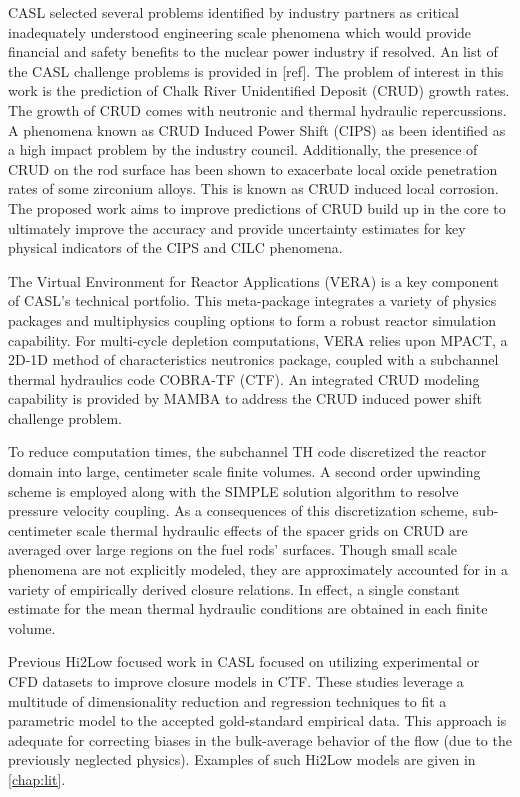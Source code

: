 CASL selected several problems identified by industry partners as critical
inadequately understood engineering scale phenomena which would provide financial and
safety benefits to the nuclear power industry if resolved.  An list of the CASL
challenge problems is provided in [ref].  The problem of interest in this
work is the prediction of Chalk River Unidentified Deposit (CRUD) growth rates.
The growth of CRUD comes with neutronic and thermal hydraulic repercussions.  A
phenomena known as CRUD Induced Power Shift (CIPS) as been identified as a high
impact problem by the industry council.  Additionally, the presence of CRUD on the rod
surface has been shown to exacerbate local oxide penetration rates of some zirconium alloys.
This is known as CRUD induced local corrosion.
The proposed work aims to improve predictions of CRUD build up in the core to ultimately improve the
accuracy and provide uncertainty estimates for key physical indicators of the CIPS and CILC phenomena.

The Virtual Environment for Reactor Applications (VERA) is a key component of
CASL's technical portfolio.  This meta-package integrates a variety of physics
packages and multiphysics coupling options to form a robust reactor simulation
capability.  For multi-cycle depletion computations, VERA relies upon MPACT, a
2D-1D method of characteristics neutronics package, coupled with a subchannel
thermal hydraulics code COBRA-TF (CTF).  An integrated CRUD modeling capability
is provided by MAMBA to address the CRUD induced power shift challenge problem.

To reduce computation times, the subchannel TH code discretized the reactor
domain into large, centimeter scale finite volumes.  A second order upwinding
scheme is employed along with the SIMPLE solution algorithm to resolve pressure
velocity coupling.  As a consequences of this discretization scheme, sub-centimeter scale
thermal hydraulic effects of the spacer grids on CRUD are averaged over
large regions on the fuel rods' surfaces.  Though small scale phenomena are not
explicitly modeled, they are approximately accounted for in a variety of empirically derived
closure relations.  In effect, a single constant estimate for the mean thermal
hydraulic conditions are obtained in each finite volume.

Previous Hi2Low focused work in CASL focused on utilizing experimental or CFD
datasets to improve closure models in CTF.  These studies leverage a multitude of
dimensionality reduction and regression techniques
to fit a parametric model to the accepted gold-standard empirical data.  This approach
is adequate for correcting biases in the bulk-average behavior of the flow (due to
the previously neglected physics).  Examples of such Hi2Low models are given in
\autoref{chap:lit}.

